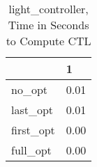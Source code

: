 \begin{table}
\caption{light\_controller, Time in Seconds to Compute CTL}
\label{light_controller_CTL_time}
\begin{tabular}{ll}
\toprule
 & 1 \\
\midrule
no\_opt & 0.01 \\
last\_opt & 0.01 \\
first\_opt & 0.00 \\
full\_opt & 0.00 \\
\bottomrule
\end{tabular}
\end{table}
